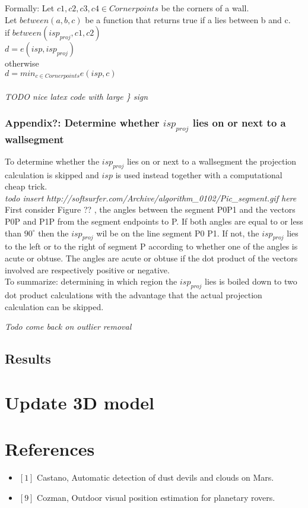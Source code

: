 \documentclass[10pt]{article}
\begin{document}
Formally:
Let $c1,c2,c3,c4 \in Cornerpoints$ be the corners of a wall.\\
Let $between(a,b,c)$ be a function that returns true if a lies between b and c.\\
if $between(isp_{proj}, c1, c2)$\\
$d = e(isp, isp_{proj})$\\
otherwise\\
$d = min_{c \in Cornerpoints} e(isp, c)$\\
\\
\textit{TODO nice latex code with large \} sign}\\


\subsubsection{Appendix?: Determine whether $isp_{proj}$ lies on or next to a wallsegment}



To determine whether the $isp_{proj}$ lies on or next to a wallsegment the
projection calculation is skipped and $isp$ is used instead together with a
computational cheap trick.\\
\textit{ todo insert http://softsurfer.com/Archive/algorithm\_0102/Pic\_segment.gif here}\\
First consider Figure ?? , the angles between the segment P0P1 and the vectors P0P and P1P
from the segment endpoints to P. If both angles are equal to or less than
$90^{\circ}$ then the $isp_{proj}$ wil be on the line segment P0 P1.  If not,
the $isp_{proj}$ lies to the left or to the right of segment P according to
whether one of the angles is acute or obtuse.  The angles are acute or obtuse
if the dot product of the vectors involved are respectively positive or
	negative.\\
To summarize: determining in which region the $isp_{proj}$ lies is boiled down to
two dot product calculations with the advantage that the actual projection
calculation can be skipped.


\textit{Todo come back on outlier removal}
\subsection{Results}

\section{Update 3D model}


\section{References}
\begin{itemize}
\item $[1]$ Castano, Automatic detection of dust devils and clouds on Mars.
\item $[9]$ Cozman, Outdoor visual position estimation for planetary rovers.
\end{itemize}
\end{document}
